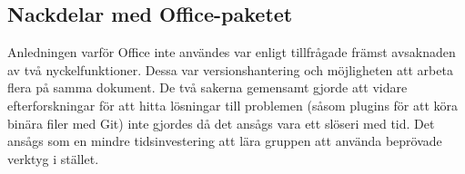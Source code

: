 \subsection{Nackdelar med Office-paketet}
Anledningen varför Office inte användes var enligt tillfrågade främst avsaknaden av två nyckelfunktioner. Dessa var versionshantering och möjligheten att arbeta flera på samma dokument. De två sakerna gemensamt gjorde att vidare efterforskningar för att hitta lösningar till problemen (såsom plugins för att köra binära filer med Git) inte gjordes då det ansågs vara ett slöseri med tid. Det ansågs som en mindre tidsinvestering att lära gruppen att använda beprövade verktyg i stället.





